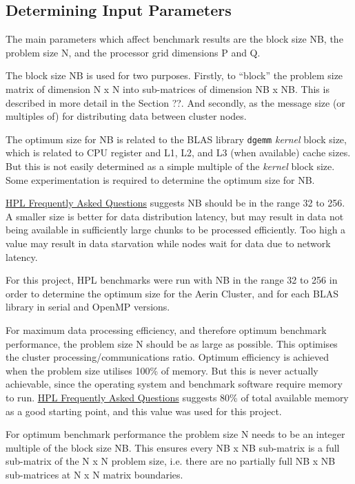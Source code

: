 \documentclass{report}
\begin{document}
%
%
\subsection{Determining Input Parameters}

The main parameters which affect benchmark results are the block size NB, the problem size N, and the processor grid dimensions P and Q.

The block size NB is used for two purposes. Firstly, to ``block'' the problem size matrix of dimension N x N into sub-matrices of dimension NB x NB. This is described in more detail in the Section ??. And secondly, as the message size (or multiples of) for distributing data between cluster nodes.

The optimum size for NB is related to the BLAS library \verb|dgemm| \emph{kernel} block size, which is related to CPU register and L1, L2, and L3 (when available) cache sizes. But this is not easily determined as a simple multiple of the \emph{kernel} block size. Some experimentation is required to determine the optimum size for NB.

\href{https://www.netlib.org/benchmark/hpl/faqs.html}{HPL Frequently Asked Questions} suggests NB should be in the range 32 to 256. A smaller size is better for data distribution latency, but may result in data not being available in sufficiently large chunks to be processed efficiently. Too high a value may result in data starvation while nodes wait for data due to network latency.

For this project, HPL benchmarks were run with NB in the range 32 to 256 in order to determine the optimum size for the Aerin Cluster, and for each BLAS library in serial and OpenMP versions. 

For maximum data processing efficiency, and therefore optimum benchmark performance, the problem size N should be as large as possible. This optimises the cluster processing/communications ratio. Optimum efficiency is achieved when the problem size utilises 100\% of memory. But this is never actually achievable, since the operating system and benchmark software require memory to run. \href{https://www.netlib.org/benchmark/hpl/faqs.html}{HPL Frequently Asked Questions} suggests 80\% of total available memory as a good starting point, and this value was used for this project.

For optimum benchmark performance the problem size N needs to be an integer multiple of the block size NB. This ensures every NB x NB sub-matrix is a full sub-matrix of the N x N problem size, i.e. there are no partially full NB x NB sub-matrices at N x N matrix boundaries.
\end{document}
